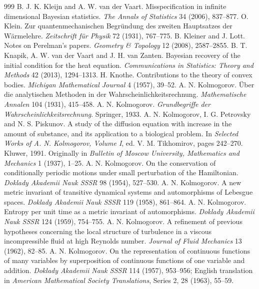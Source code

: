 \begin{thebibliography}{999}
 B. J. K. Kleijn and A. W. van der Vaart. Misspecification in infinite dimensional Bayesian statistics. \emph{The Annals of Statistics} 34 (2006), 837--877.
 O. Klein. Zur quantenmechanischen Begr\"undung des zweiten Hauptsatzes der W\"armelehre. \emph{Zeitschrift f\"ur Physik} 72 (1931), 767--775.
 B. Kleiner and J. Lott. Notes on Perelman's papers. \emph{Geometry \& Topology} 12 (2008), 2587--2855.
 B. T. Knapik, A. W. van der Vaart and J. H. van Zanten. Bayesian recovery of the initial condition for the heat equation. \emph{Communications in Statistics: Theory and Methods} 42 (2013), 1294--1313.
 H. Knothe. Contributions to the theory of convex bodies. \emph{Michigan Mathematical Journal} 4 (1957), 39--52.
 A. N. Kolmogorov. \"Uber die analytischen Methoden in der Wahrscheinlichkeitsrechnung. \emph{Mathematische Annalen} 104 (1931), 415--458.
 A. N. Kolmogorov. \emph{Grundbegriffe der Wahrscheinlichkeitsrechnung}. Springer, 1933.
 A. N. Kolmogorov, I. G. Petrovsky and N. S. Piskunov. A study of the diffusion equation with increase in the amount of substance, and its application to a biological problem. In \emph{Selected Works of A. N. Kolmogorov, Volume I}, ed. V. M. Tikhomirov, pages 242--270. Kluwer, 1991. Originally in \emph{Bulletin of Moscow University, Mathematics and Mechanics} 1 (1937), 1--25.
 A. N. Kolmogorov. On the conservation of conditionally periodic motions under small perturbation of the Hamiltonian. \emph{Doklady Akademii Nauk SSSR} 98 (1954), 527--530.
 A. N. Kolmogorov. A new metric invariant of transitive dynamical systems and automorphisms of Lebesgue spaces. \emph{Doklady Akademii Nauk SSSR} 119 (1958), 861--864.
 A. N. Kolmogorov. Entropy per unit time as a metric invariant of automorphisms. \emph{Doklady Akademii Nauk SSSR} 124 (1959), 754--755.
 A. N. Kolmogorov. A refinement of previous hypotheses concerning the local structure of turbulence in a viscous incompressible fluid at high Reynolds number. \emph{Journal of Fluid Mechanics} 13 (1962), 82--85.
 A. N. Kolmogorov. On the representation of continuous functions of many variables by superposition of continuous functions of one variable and addition. \emph{Doklady Akademii Nauk SSSR} 114 (1957), 953--956; English translation in \emph{American Mathematical Society Translations}, Series 2, 28 (1963), 55--59.

\end{thebibliography}
